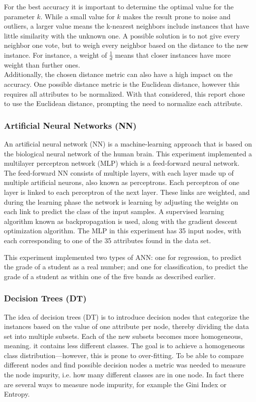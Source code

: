 	For the best accuracy it is important to determine the optimal value for the parameter $k$. While a small value for $k$ makes the result prone to noise and outliers, a larger value means the k-nearest neighbors include instances that have little similarity with the unknown one. A possible solution is to not give every neighbor one vote, but to weigh every neighbor based on the distance to the new instance. For instance, a weight of $\frac{1}{d}$ means that closer instances have more weight than further ones. 
	\\	
	Additionally, the chosen distance metric can also have a high impact on the accuracy. One possible distance metric is the Euclidean distance, however this requires all attributes to be normalized. With that considered, this report chose to use the Euclidean distance, prompting the need to normalize each attribute.

	\subsubsection{Artificial Neural Networks (NN)}
	An artificial neural network (NN) is a machine-learning approach that is based on the biological neural network of the human brain. This experiment implemented a multilayer perceptron network (MLP) which is a feed-forward neural network. The feed-forward NN consists of multiple layers, with each layer made up of multiple artificial neurons, also known as perceptrons. Each perceptron of one layer is linked to each perceptron of the next layer. These links are weighted, and during the learning phase the network is learning by adjusting the weights on each link to predict the class of the input samples. A supervised learning algorithm known as backpropagation is used, along with the gradient descent optimization algorithm.
	The MLP in this experiment has 35 input nodes, with each corresponding to one of the 35 attributes found in the data set.
	
	This experiment implemented two types of ANN: one for regression, to predict the grade of a student as a real number; and one for classification, to predict the grade of a student as within one of the five bands as described earlier.
	
	\subsubsection{Decision Trees (DT)}
	The idea of decision trees (DT) is to introduce decision nodes that categorize the instances based on the value of one attribute per node, thereby dividing the data set into multiple subsets. Each of the new subsets becomes more homogeneous, meaning. it contains less different classes. The goal is to achieve a homogeneous class distribution—however, this is prone to over-fitting. 
	To be able to compare different nodes and find possible decision nodes a metric was needed to measure the node impurity, i.e. how many different classes are in one node. In fact there are several ways to measure node impurity, for example the Gini Index or Entropy.
	

